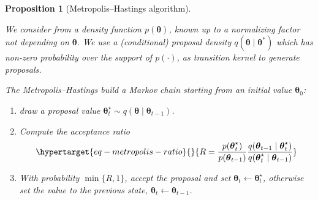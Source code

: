 \documentclass[
  11pt,
  letterpaper,
]{scrbook}
\providecommand{\tightlist}{%
  \setlength{\itemsep}{0pt}\setlength{\parskip}{0pt}}\usepackage{longtable,booktabs,array}
\theoremstyle{definition}
\theoremstyle{definition}
\theoremstyle{definition}
\theoremstyle{plain}
\newtheorem{proposition}{Proposition}[chapter]
\theoremstyle{remark}
\begin{document}
\begin{proposition}[Metropolis--Hastings
algorithm]\protect\hypertarget{prp-metropolis}{}\label{prp-metropolis}

We consider from a density function \(p(\boldsymbol{\theta})\), known up
to a normalizing factor not depending on \(\boldsymbol{\theta}\). We use
a (conditional) proposal density
\(q(\boldsymbol{\theta} \mid \boldsymbol{\theta}^*)\) which has non-zero
probability over the support of \(p(\cdot)\), as transition kernel to
generate proposals.

The Metropolis--Hastings build a Markov chain starting from an initial
value \(\boldsymbol{\theta}_0\):

\begin{enumerate}
\def\labelenumi{\arabic{enumi}.}
\tightlist
\item
  draw a proposal value
  \(\boldsymbol{\theta}_t^{\star} \sim q(\boldsymbol{\theta} \mid \boldsymbol{\theta}_{t-1})\).
\item
  Compute the acceptance ratio
  \begin{equation}\protect\hypertarget{eq-metropolis-ratio}{}{
  R = \frac{p(\boldsymbol{\theta}_t^{\star})}{p(\boldsymbol{\theta}_{t-1})}\frac{q(\boldsymbol{\theta}_{t-1} \mid \boldsymbol{\theta}_t^{\star} )}{q(\boldsymbol{\theta}_t^{\star} \mid \boldsymbol{\theta}_{t-1})}
  }\label{eq-metropolis-ratio}\end{equation}
\item
  With probability \(\min\{R, 1\}\), accept the proposal and set
  \(\boldsymbol{\theta}_t \gets \boldsymbol{\theta}_t^{\star}\),
  otherwise set the value to the previous state,
  \(\boldsymbol{\theta}_t \gets \boldsymbol{\theta}_{t-1}\).
\end{enumerate}

\end{proposition}
\end{document}
